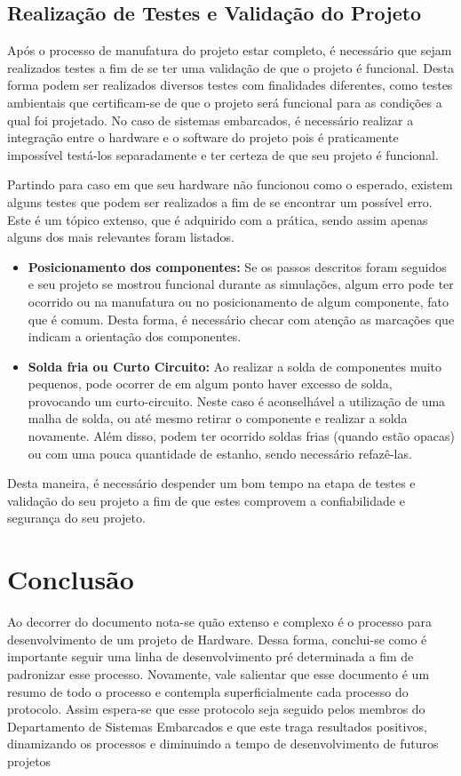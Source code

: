 \subsection{Realização de Testes e Validação do Projeto}

Após o processo de manufatura do projeto estar completo, é necessário que sejam realizados testes a fim de se ter uma validação de que o projeto é funcional. Desta forma podem ser realizados diversos testes com finalidades diferentes, como testes ambientais que certificam-se de que o projeto será  funcional para as condições a qual foi projetado. No caso de sistemas embarcados, é necessário realizar a integração entre o hardware e o software do projeto pois é praticamente impossível testá-los  separadamente e ter certeza de que seu projeto é funcional.

Partindo para caso em que seu hardware não funcionou como o esperado, existem alguns testes que podem ser realizados a fim de se encontrar um possível erro. Este é um tópico extenso,  que é adquirido com a prática, sendo assim apenas alguns dos mais relevantes foram listados.

\begin{itemize}
    \item \textbf{Posicionamento dos componentes:}
    Se os passos descritos foram seguidos e seu projeto se mostrou funcional durante as simulações, algum erro pode ter ocorrido ou na manufatura ou no posicionamento de algum componente, fato que é comum. Desta forma, é necessário checar com atenção as marcações que indicam a orientação dos componentes.
    \item \textbf{Solda fria ou Curto Circuito:}
    Ao realizar a solda de componentes muito pequenos, pode ocorrer de em algum ponto haver excesso de solda, provocando um curto-circuito. Neste caso é aconselhável a utilização de uma malha de solda, ou até  mesmo retirar o componente e realizar a solda novamente. Além disso, podem ter ocorrido soldas frias (quando estão opacas) ou com uma pouca quantidade de estanho, sendo necessário refazê-las.

\end{itemize}

Desta maneira, é necessário despender um bom tempo na etapa de testes e validação do seu projeto a  fim de que estes comprovem a confiabilidade e segurança do seu projeto.

\section{Conclusão} 

Ao decorrer do documento nota-se quão extenso e complexo é o processo para desenvolvimento de um projeto de Hardware. Dessa forma, conclui-se como é importante seguir uma linha de desenvolvimento pré determinada a fim de padronizar esse processo. Novamente, vale salientar que esse documento é um resumo de todo o processo e contempla superficialmente cada processo do protocolo. Assim espera-se que esse protocolo seja seguido pelos membros do Departamento de Sistemas Embarcados e que este traga resultados positivos, dinamizando os processos e diminuindo a tempo de desenvolvimento de futuros projetos